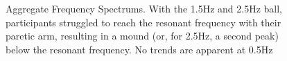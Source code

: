 \documentclass{article}
\begin{document}
\begin{figure}[!ht]
     \centering
     \hfill
     \hfill
	\caption{Aggregate Frequency Spectrums. With the 1.5Hz and 2.5Hz ball, participants struggled to reach the resonant frequency with their paretic arm, resulting in a mound (or, for 2.5Hz, a second peak) below the resonant frequency. No trends are apparent at 0.5Hz}
\end{figure}
\end{document}

